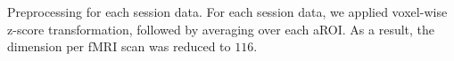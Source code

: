 \label{fig:prep}
Preprocessing for each session data. 
For each session data, we applied voxel-wise z-score transformation, followed by averaging over each aROI. 
As a result, the dimension per fMRI scan was reduced to $116$.
